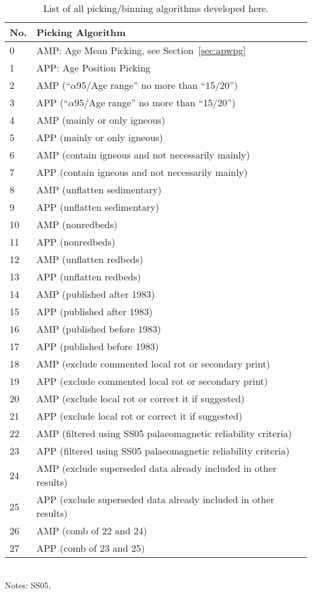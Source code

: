 \begin{table}[!ht]
  \centering
  \caption{List of all picking/binning algorithms developed here.}\label{tab-pick}
  \begin{tabular}{@{}ll@{}}
    \toprule
    No. & Picking Algorithm \\ \midrule
    0 & AMP\@: Age Mean Picking, see Section~\ref{sec:apwpg} \\
    1 & APP\@: Age Position Picking \\
    2 & AMP (``$\alpha$95/Age range'' no more than ``15/20'') \\
    3 & APP (``$\alpha$95/Age range'' no more than ``15/20'') \\
    4 & AMP (mainly or only igneous) \\
    5 & APP (mainly or only igneous) \\
    6 & AMP (contain igneous and not necessarily mainly) \\
    7 & APP (contain igneous and not necessarily mainly) \\
    8 & AMP (unflatten sedimentary) \\
    9 & APP (unflatten sedimentary) \\
    10 & AMP (nonredbeds) \\
    11 & APP (nonredbeds) \\
    12 & AMP (unflatten redbeds) \\
    13 & APP (unflatten redbeds) \\
    14 & AMP (published after 1983) \\
    15 & APP (published after 1983) \\
    16 & AMP (published before 1983) \\
    17 & APP (published before 1983) \\
    18 & AMP (exclude commented local rot or secondary print) \\
    19 & APP (exclude commented local rot or secondary print) \\
    20 & AMP (exclude local rot or correct it if suggested) \\
    21 & APP (exclude local rot or correct it if suggested) \\
    22 & AMP (filtered using SS05 palaeomagnetic reliability criteria) \\
    23 & APP (filtered using SS05 palaeomagnetic reliability criteria) \\
    24 & AMP (exclude superseded data already included in other results) \\
    25 & APP (exclude superseded data already included in other results) \\
    26 & AMP (comb of 22 and 24) \\
    27 & APP (comb of 23 and 25) \\ \bottomrule
  \end{tabular}
  \raggedright{\\Notes: SS05,~\citet{S05}}
\end{table}

